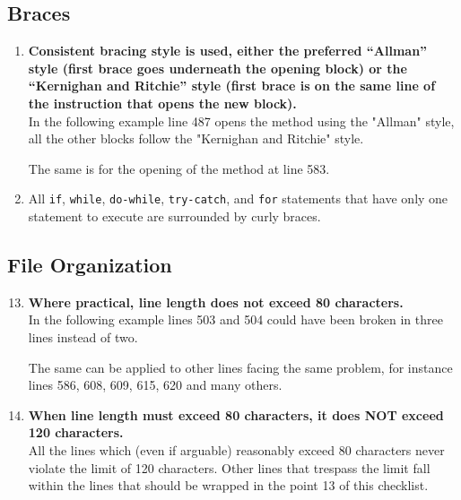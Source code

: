 \documentclass[a4paper,11pt]{report} %
\begin{document}
		\subsection*{Braces}\begin{enumerate}[resume]
			\item \textbf{Consistent bracing style is used, either the preferred ``Allman'' style (first brace goes underneath the opening block) or the ``Kernighan and Ritchie'' style (first brace is on the same line of the instruction that opens the new block).}\smallskip \\
				In the following example line 487 opens the method using the "Allman" style, all the other blocks follow the "Kernighan and Ritchie" style.
				
				The same is for the opening of the method at line 583.
			\item All \texttt{if}, \texttt{while}, \texttt{do-while}, \texttt{try-catch}, and \texttt{for} statements that have only one statement to execute are surrounded by curly braces.			
		\end{enumerate}
		
		\subsection*{File Organization}\begin{enumerate}[resume]
			\setcounter{enumi}{12}
			\item \textbf{Where practical, line length does not exceed 80 characters.}\smallskip \\
				In the following example lines 503 and 504 could have been broken in three lines instead of two.
				
				The same can be applied to other lines facing the same problem, for instance lines 586, 608, 609, 615, 620 and many others.
			\item \textbf{When line length must exceed 80 characters, it does NOT exceed 120 characters.}\smallskip \\
				All the lines which (even if arguable) reasonably exceed 80 characters never violate the limit of 120 characters. Other lines that trespass the limit fall within the lines that should be wrapped in the point 13 of this checklist.
		\end{enumerate}
		
\end{document}
